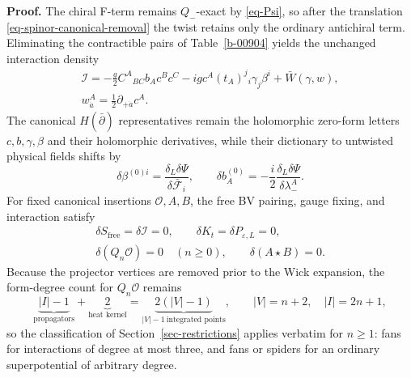\documentclass[11pt]{article}
\numberwithin{equation}{section}
\numberwithin{figure}{section}
\numberwithin{table}{section}
\begin{document}
\begin{proofbox}
\textbf{Proof.}
The chiral F-term remains $Q_-$-exact by \eqref{eq-Psi}, so after the translation \eqref{eq-spinor-canonical-removal} the twist retains only the ordinary antichiral term. Eliminating the contractible pairs of Table~\ref{b-00904} yields the unchanged interaction density
\begin{equation}\label{eq-derivative-interaction}
\begin{gathered}
\mathcal I=-\frac g2C^A{}_{BC}b_Ac^Bc^C
-igc^A(t_A)^j{}_i\gamma_j\beta^i
+\bar W(\gamma,w),\\
w_{\dot a}^A=\frac12\partial_{+\dot a}c^A.
\end{gathered}
\end{equation}
The canonical $H(\bar\partial)$ representatives remain the holomorphic zero-form letters $c,b,\gamma,\beta$ and their holomorphic derivatives, while their dictionary to untwisted physical fields shifts by
\begin{equation}\label{eq-spinor-representative-shift}
\delta\beta^{(0)i}
=\frac{\delta_L\delta\Psi}{\delta\bar{\mathcal F}_i},
\qquad
\delta b_A^{(0)}
=-\frac i2\frac{\delta_L\delta\Psi}{\delta\lambda_-^A}.
\end{equation}
For fixed canonical insertions $\mathcal O,A,B$, the free BV pairing, gauge fixing, and interaction satisfy
\begin{equation}\label{eq-spinor-unchanged-operations}
\begin{gathered}
\delta S_{\mathrm{free}}=\delta\mathcal I=0,
\qquad \delta K_t=\delta P_{\varepsilon,L}=0,\\
\delta(Q_n\mathcal O)=0\quad(n\ge0),
\qquad \delta(A\star B)=0.
\end{gathered}
\end{equation}
Because the projector vertices are removed prior to the Wick expansion, the form-degree count for $Q_n\mathcal O$ remains
\begin{equation}\label{eq-spinor-degree-count}
\underbrace{|I|-1}_{\text{propagators}}
+\underbrace{2}_{\text{heat kernel}}
=\underbrace{2(|V|-1)}_{|V|-1\ \text{integrated points}},
\qquad |V|=n+2,\quad |I|=2n+1,
\end{equation}
so the classification of Section~\ref{sec-restrictions} applies verbatim for $n\ge1$: fans for interactions of degree at most three, and fans or spiders for an ordinary superpotential of arbitrary degree.~\hfill\qedsymbol
\end{proofbox}
\end{document}
